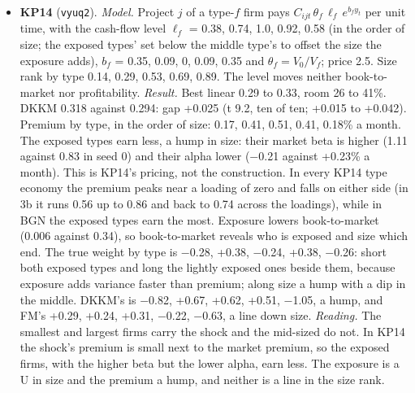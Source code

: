 \documentclass[11pt]{article}
\begin{document}
\begin{itemize}
\item \textbf{KP14} (\texttt{vyuq2}). \emph{Model.} Project $j$ of a type-$f$ firm pays $C_{ijt}\,\theta_f\,\ell_f\,e^{b_f y_t}$ per unit time, with the cash-flow level $\ell_f$ = 0.38, 0.74, 1.0, 0.92, 0.58 (in the order of size; the exposed types' set below the middle type's to offset the size the exposure adds), $b_f$ = 0.35, 0.09, 0, 0.09, 0.35 and $\theta_f = V_0/V_f$; price 2.5. Size rank by type 0.14, 0.29, 0.53, 0.69, 0.89. The level moves neither book-to-market nor profitability. \emph{Result.} Best linear 0.29 to 0.33, room 26 to 41\%. DKKM 0.318 against 0.294: gap +0.025 (t 9.2, ten of ten; +0.015 to +0.042). Premium by type, in the order of size: 0.17, 0.41, 0.51, 0.41, 0.18\% a month. The exposed types earn less, a hump in size: their market beta is higher (1.11 against 0.83 in seed 0) and their alpha lower ($-$0.21 against +0.23\% a month). This is KP14's pricing, not the construction. In every KP14 type economy the premium peaks near a loading of zero and falls on either side (in 3b it runs 0.56 up to 0.86 and back to 0.74 across the loadings), while in BGN the exposed types earn the most. Exposure lowers book-to-market (0.006 against 0.34), so book-to-market reveals who is exposed and size which end. The true weight by type is $-$0.28, +0.38, $-$0.24, +0.38, $-$0.26: short both exposed types and long the lightly exposed ones beside them, because exposure adds variance faster than premium; along size a hump with a dip in the middle. DKKM's is $-$0.82, +0.67, +0.62, +0.51, $-$1.05, a hump, and FM's +0.29, +0.24, +0.31, $-$0.22, $-$0.63, a line down size. \emph{Reading.} The smallest and largest firms carry the shock and the mid-sized do not. In KP14 the shock's premium is small next to the market premium, so the exposed firms, with the higher beta but the lower alpha, earn less. The exposure is a U in size and the premium a hump, and neither is a line in the size rank.

\end{itemize}
\end{document}
